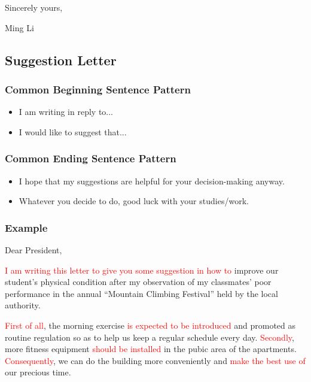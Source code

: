 \documentclass{article}
\begin{document}
\hfill Sincerely yours,

\hfill Ming Li

\subsection{Suggestion Letter}
\label{sec:suggestion-letter}

\subsubsection{Common Beginning Sentence Pattern}
\label{sec:comm-beginn-sent-1}

\begin{itemize}
\item I am writing in reply to...
\item I would like to suggest that...
\end{itemize}

\subsubsection{Common Ending Sentence Pattern}
\label{sec:comm-ending-sent-1}

\begin{itemize}
\item I hope that my suggestions are helpful for your decision-making anyway.
\item Whatever you decide to do, good luck with your studies/work.
\end{itemize}

\subsubsection{Example}
\label{sec:example-1}
Dear President,
\par \textcolor{red}{I am writing this letter to give you some suggestion in how to} improve our student's
physical condition after my observation of my classmates' poor performance in the annual
``Mountain Climbing Festival'' held by the local authority.
\par \textcolor{red}{First of all}, the morning exercise \textcolor{red}{is expected to be introduced} and promoted as
routine regulation so as to help us keep a regular schedule every day. \textcolor{red}{Secondly}, more
fitness equipment \textcolor{red}{should be installed} in the pubic area of the
apartments. \textcolor{red}{Consequently}, we can do the building more conveniently and
\textcolor{red}{make the best use of} our precious time.
\end{document}
